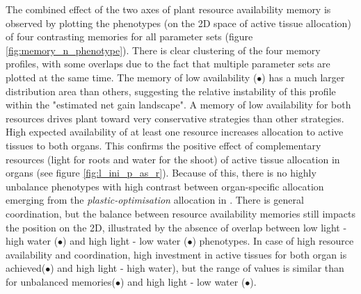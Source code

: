 The combined effect of the two axes of plant resource availability memory is observed by plotting the phenotypes (on the 2D space of active tissue allocation) of four contrasting memories for all parameter sets (figure \ref{fig:memory_n_phenotype}). There is clear clustering of the four memory profiles, with some overlaps due to the fact that multiple parameter sets are plotted at the same time. The memory of low availability (\textcolor{myRed}{$\bullet$}) has a much larger distribution area than others, suggesting the relative instability of this profile within the "estimated net gain landscape". A memory of low availability for both resources drives plant toward very conservative strategies than other strategies. High expected availability of at least one resource increases allocation to active tissues to both organs. This confirms the positive effect of complementary resources (light for roots and water for the shoot) of active tissue allocation in organs (see figure \ref{fig:l_ini_p_as_r}). Because of this, there is no highly unbalance phenotypes with high contrast between organ-specific allocation emerging from the \textit{plastic-optimisation} allocation in \model. There is general coordination, but the balance between resource availability memories still impacts the position on the 2D, illustrated by the absence of overlap between low light - high water  (\textcolor{myBlue}{$\bullet$}) and high light - low water (\textcolor{myYellow}{$\bullet$}) phenotypes. In case of high resource availability and coordination, high investment in active tissues for both organ is achieved(\textcolor{myGreen}{$\bullet$}) and high light - high water), but the range of values is similar than for unbalanced memories(\textcolor{myBlue}{$\bullet$}) and high light - low water (\textcolor{myYellow}{$\bullet$}).

